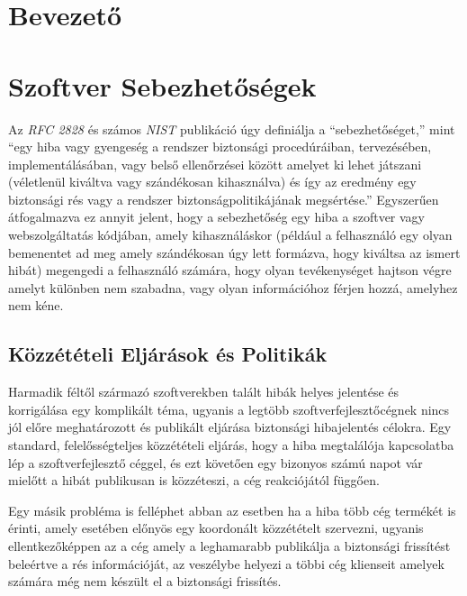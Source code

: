 \documentclass[a4paper,12pt]{article}
\begin{document}
	\begingroup
	\hypersetup{linkcolor=lightblue}
	\listoffigures
	\renewcommand*{\listoflistingscaption}{Kódrészletek jegyzéke}
	\listoflistings
	\endgroup

\newpage
\pagestyle{fancy}
\section{Bevezető}
	
	
	
\section{Szoftver Sebezhetőségek}
	
	Az \textit{RFC 2828} és számos \textit{NIST} publikáció úgy definiálja a ``sebezhetőséget,'' mint ``egy hiba vagy gyengeség a rendszer biztonsági procedúráiban, tervezésében, implementálásában, vagy belső ellenőrzései között amelyet ki lehet játszani (véletlenül kiváltva vagy szándékosan kihasználva) és így az eredmény egy biztonsági rés vagy a rendszer biztonságpolitikájának megsértése.''\cite{rfc2828,nist80030} Egyszerűen átfogalmazva ez annyit jelent, hogy a sebezhetőség egy hiba a szoftver vagy webszolgáltatás kódjában, amely kihasználáskor (például a felhasználó egy olyan bemenentet ad meg amely szándékosan úgy lett formázva, hogy kiváltsa az ismert hibát) megengedi a felhasználó számára, hogy olyan tevékenységet hajtson végre amelyt különben nem szabadna, vagy olyan információhoz férjen hozzá, amelyhez nem kéne.
	
\subsection{Közzétételi Eljárások és Politikák}
	
	Harmadik féltől származó szoftverekben talált hibák helyes jelentése és korrigálása egy komplikált téma, ugyanis a legtöbb szoftverfejlesztőcégnek nincs jól előre meghatározott és publikált eljárása biztonsági hibajelentés célokra. Egy standard, felelősségteljes közzétételi eljárás, hogy a hiba megtalálója kapcsolatba lép a szoftverfejlesztő céggel, és ezt követően egy bizonyos számú napot vár mielőtt a hibát publikusan is közzéteszi, a cég reakciójától függően.
	
	Egy másik probléma is felléphet abban az esetben ha a hiba több cég termékét is érinti, amely esetében előnyös egy koordonált közzétételt szervezni, ugyanis ellentkezőképpen az a cég amely a leghamarabb publikálja a biztonsági frissítést beleértve a rés információját, az veszélybe helyezi a többi cég klienseit amelyek számára még nem készült el a biztonsági frissítés.
	
\end{document}
